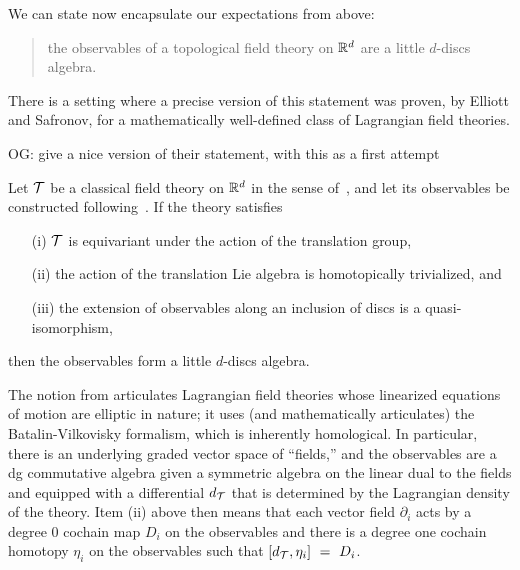 \documentclass[11pt]{amsart}
\def\owen#1{{\textcolor{violet!65!black}{OG: {#1}}}}
\begin{document}
We can state now encapsulate our expectations from above:
\begin{quote}
the observables of a topological field theory on $\mathbb R^d$ are a little $d$-discs algebra.
\end{quote}
There is a setting where a precise version of this statement was proven, by Elliott and Safronov, for a mathematically well-defined class of Lagrangian field theories.

\owen{give a nice version of their statement, with this as a first attempt}

\begin{thm}[\cite{EllSaf},\owen{precise location}]
Let $\mathcal T$ be a classical field theory on $\mathbb R^d$ in the sense of~\cite{CosBook},
and let its observables be constructed following~\cite{CG2}.
If the theory satisfies 
\begin{enumerate}
\item[(i)] $\mathcal T$ is equivariant under the action of the translation group,
\item[(ii)] the action of the translation Lie algebra is homotopically trivialized, and
\item[(iii)] the extension of observables along an inclusion of discs is a quasi-isomorphism,
\end{enumerate}
then the observables form a little $d$-discs algebra.
\end{thm}

The notion from \cite{CosBook} articulates Lagrangian field theories whose linearized equations of motion are elliptic in nature;
it uses (and mathematically articulates) the Batalin-Vilkovisky formalism,
which is inherently homological.
In particular, there is an underlying graded vector space of ``fields,''
and the observables are a dg commutative algebra given a symmetric algebra on the linear dual to the fields and equipped with a differential $d_\mathcal T$ that is determined by the Lagrangian density of the theory.
Item (ii) above then means that each vector field $\partial_i$ acts by a degree 0 cochain map $D_i$ on the observables and there is a degree one cochain homotopy $\eta_i$ on the observables such that $[d_\mathcal T, \eta_i]~=~D_i$.
\end{document}
